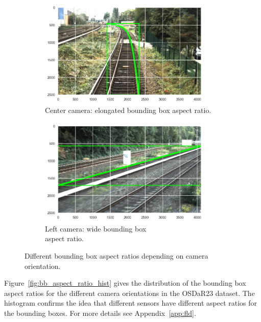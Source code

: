 \documentclass[Master,MDS,english]{BASE/twbook} %
\begin{document}
\begin{figure}
\centering
\begin{subfigure}{.5\textwidth}
  \centering
  \includegraphics[width=0.9\textwidth]{images/datasets/db/aspect_ratio_long}
  \caption{Center camera: elongated bounding box aspect ratio.}
   \label{fig:bb_long}
\end{subfigure}%
\begin{subfigure}{.5\textwidth}
  \centering
  \includegraphics[width=0.9\textwidth]{images/datasets/db/aspect_ratio_wide}
  \caption{Left camera: wide bounding box \\ aspect ratio. }
  \label{fig:bb_wide}
\end{subfigure}
\caption{Different bounding box aspect ratios depending on camera orientation.}
\label{fig:bb_examples}
\end{figure}

Figure~\ref{fig:bb_aspect_ratio_hist} gives the distribution of the bounding box aspect ratios for the different camera orientations in the OSDaR23 dataset. 
The histogram confirms the idea that different sensors have different aspect ratios for the bounding boxes. For more details see Appendix~\ref{app:fld}.
\end{document}
